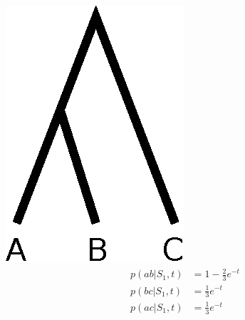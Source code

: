 \documentclass[11pt,a4paper]{report}
\begin{document}
	\begin{minipage}[b]{0.3\linewidth}
		\centering
		\includegraphics[width=0.66\linewidth]{Hybrid_tree_ab.eps}\\
		\begin{align*}
p(ab|S_1, t) &= 1 - \frac{2}{3}e^{-t}\\
p(bc|S_1, t) &= \frac{1}{3}e^{-t}\\
p(ac|S_1, t) &= \frac{1}{3}e^{-t}\\
\end{align*}

	\end{minipage}
	\hfill
\end{document}
